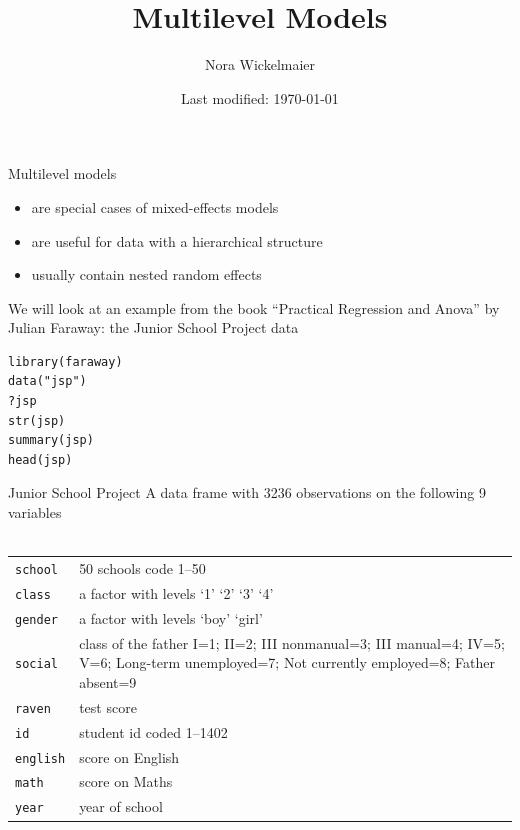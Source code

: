 \documentclass[aspectratio=169]{beamer}
\title{Multilevel Models}
\author{Nora Wickelmaier}
\date{Last modified: \today}
\begin{document}
\begin{frame}{}
\thispagestyle{empty}
\titlepage
\end{frame}


\begin{frame}[fragile]{Multilevel models}
  \begin{itemize}
    \item are special cases of mixed-effects models
    \item are useful for data with a hierarchical structure
    \item usually contain nested random effects
  \end{itemize}
  \vspace{.3cm}
  We will look at an example from the book ``Practical Regression and
  Anova'' by Julian Faraway: the Junior School Project data
\begin{lstlisting}
library(faraway)
data("jsp")
?jsp
str(jsp)
summary(jsp)
head(jsp)
\end{lstlisting}
  \nocite{Faraway2025}
\end{frame}

\begin{frame}{Junior School Project}
  A data frame with 3236 observations on the following 9 variables\\~\\

  \begin{tabular}{lp{8cm}}
    \hline
     \texttt{school} & 50 schools code 1--50 \\
     \texttt{class} & a factor with levels `1' `2' `3' `4' \\
     \texttt{gender} & a factor with levels `boy' `girl' \\
     \texttt{social} & class of the father I=1; II=2; III nonmanual=3; III
          manual=4; IV=5; V=6; Long-term unemployed=7; Not currently
          employed=8; Father absent=9 \\
     \texttt{raven} & test score \\
     \texttt{id} & student id coded 1--1402 \\
     \texttt{english} & score on English \\
     \texttt{math} & score on Maths \\
     \texttt{year} & year of school \\
     \hline
  \end{tabular}

\end{frame}
\end{document}
